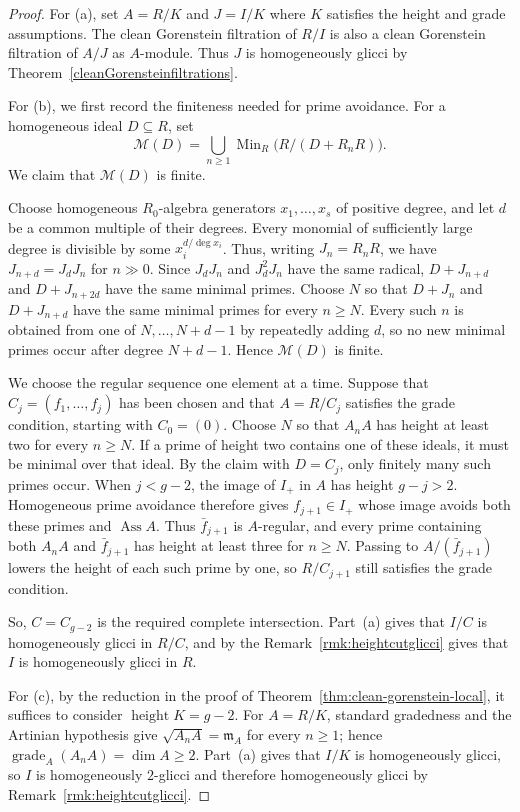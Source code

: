 \documentclass[11pt,letterpaper]{amsart}
\DeclareMathOperator{\Ass}{Ass}
\DeclareMathOperator{\Min}{Min}
\DeclareMathOperator{\gr}{grade}
\DeclareMathOperator{\height}{height}
\theoremstyle{plain}
\theoremstyle{definition}
\theoremstyle{remark}
\begin{document}
\begin{proof}
For \textup{(a)}, set \(A=R/K\) and \(J=I/K\) where $K$ satisfies the height and grade assumptions. The clean Gorenstein
filtration of \(R/I\) is also a clean Gorenstein filtration of \(A/J\) as $A$-module. Thus \(J\) is homogeneously glicci by
Theorem~\ref{cleanGorensteinfiltrations}.

For \textup{(b)}, we first record the finiteness needed for prime
avoidance. For a homogeneous ideal \(D\subseteq R\), set
\[
   \mathcal M(D)=\bigcup_{n\geq 1}\Min_R\bigl(R/(D+R_nR)\bigr).
\]
We claim that \(\mathcal M(D)\) is finite.

Choose homogeneous \(R_0\)-algebra generators \(x_1,\ldots,x_s\) of
positive degree, and let \(d\) be a common multiple of their degrees.
Every monomial of sufficiently large degree is divisible by some
\(x_i^{d/\deg x_i}\). Thus, writing \(J_n=R_nR\), we have
\(J_{n+d}=J_dJ_n\) for \(n\gg0\). Since \(J_dJ_n\) and \(J_d^2J_n\)
have the same radical, \(D+J_{n+d}\) and \(D+J_{n+2d}\) have the same
minimal primes. Choose \(N\) so that \(D+J_n\) and \(D+J_{n+d}\) have the same minimal
primes for every \(n\geq N\). Every such \(n\) is obtained from one of
\(N,\ldots,N+d-1\) by repeatedly adding \(d\), so no new minimal primes
occur after degree \(N+d-1\). Hence \(\mathcal M(D)\) is finite.

We choose the regular sequence one element at a time. Suppose that \(C_j=(f_1,\ldots,f_j)\) has been chosen and that \(A=R/C_j\) satisfies the grade condition, starting with \(C_0=(0)\). Choose \(N\) so that \(A_nA\) has height at least two for every \(n\geq N\). If a prime of height two contains one of these ideals, it must be minimal over that ideal. By the claim with \(D=C_j\), only finitely many such primes occur. When \(j<g-2\), the image of \(I_+\) in \(A\) has height \(g-j>2\). Homogeneous prime avoidance therefore gives \(f_{j+1}\in I_+\) whose image avoids both these primes and \(\Ass A\). Thus \(\bar f_{j+1}\) is \(A\)-regular, and every prime containing both \(A_nA\) and \(\bar f_{j+1}\) has height at least three for \(n\geq N\). Passing to \(A/(\bar f_{j+1})\) lowers the height of each such prime by one, so \(R/C_{j+1}\) still satisfies the grade condition.

So, \(C=C_{g-2}\) is the required complete intersection. Part~\textup{(a)} gives that \(I/C\) is homogeneously glicci in \(R/C\), and by the Remark~\ref{rmk:heightcutglicci} gives that \(I\) is homogeneously glicci in \(R\).

For \textup{(c)}, by the reduction in the proof of
Theorem~\ref{thm:clean-gorenstein-local}, it suffices to consider
\(\height K=g-2\). For \(A=R/K\), standard gradedness and the Artinian
hypothesis give \(\sqrt{A_nA}=\mathfrak m_A\) for every \(n\geq1\); hence
\(\gr_A(A_nA)=\dim A\geq2\). Part~\textup{(a)} gives that \(I/K\) is
homogeneously glicci, so \(I\) is homogeneously \(2\)-glicci and therefore
homogeneously glicci by Remark~\ref{rmk:heightcutglicci}.
\end{proof}
\end{document}
